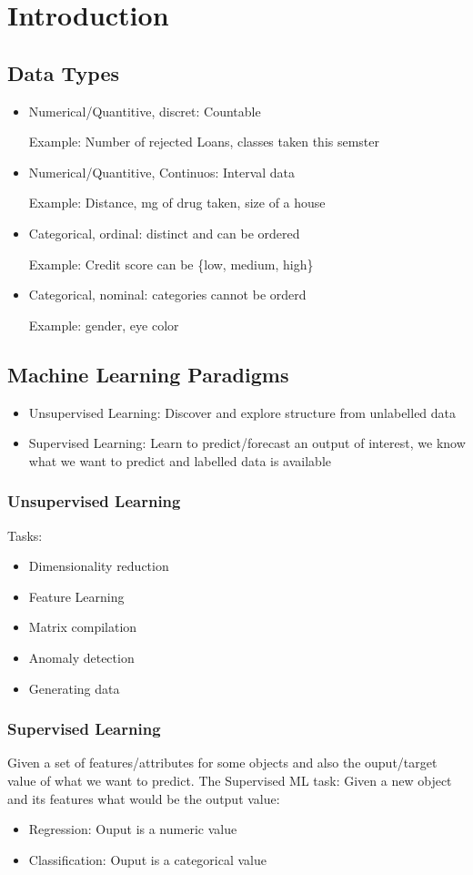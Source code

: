\section{Introduction}
\subsection{Data Types}
\begin{itemize}
    \item Numerical/Quantitive, discret: Countable
    
    Example: Number of rejected Loans, classes taken this semster
    \item Numerical/Quantitive, Continuos: Interval data 
    
    Example: Distance, mg of drug taken, size of a house
    \item Categorical, ordinal: distinct and can be ordered
    
    Example: Credit score can be \{low, medium, high\}
    \item Categorical, nominal: categories cannot be orderd
    
    Example: gender, eye color
\end{itemize}
\subsection{Machine Learning Paradigms}
\begin{itemize}
    \item Unsupervised Learning: Discover and explore structure from unlabelled data
    \item Supervised Learning: Learn to predict/forecast an output of interest, we know what we want to predict and labelled data is available
\end{itemize}
\subsubsection{Unsupervised Learning}
Tasks:
\begin{itemize}
    \item Dimensionality reduction
    \item Feature Learning
    \item Matrix compilation
    \item Anomaly detection
    \item Generating data
\end{itemize}

 \subsubsection{Supervised Learning}
 Given a set of features/attributes for some objects and also the ouput/target value of what we want to predict.
 The Supervised ML task: Given a new object and its features what would be the output value:
 \begin{itemize}
    \item Regression: Ouput is a numeric value
    \item Classification: Ouput is a categorical value
 \end{itemize}

